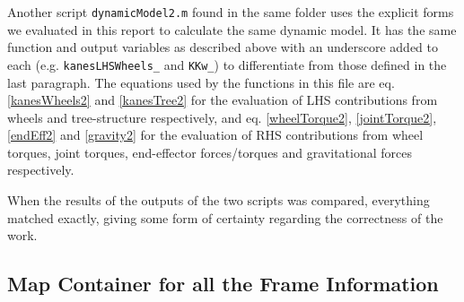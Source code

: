 \documentclass[a4paper,10pt]{article}
\begin{document}
Another script \texttt{dynamicModel2.m} found in the same folder uses the explicit forms we evaluated in this report to calculate the same dynamic model. It has the same function and output variables as described above with an underscore added to each (e.g. \texttt{kanesLHSWheels\_} and \texttt{KKw\_}) to differentiate from those defined in the last paragraph. The equations used by the functions in this file are eq. \ref{kanesWheels2} and \ref{kanesTree2} for the evaluation of LHS contributions from wheels and tree-structure respectively, and eq. \ref{wheelTorque2}, \ref{jointTorque2}, \ref{endEff2} and \ref{gravity2} for the evaluation of RHS contributions from wheel torques, joint torques, end-effector forces/torques and gravitational forces respectively.

When the results of the outputs of the two scripts was compared, everything matched exactly, giving some form of certainty regarding the correctness of the work.


\subsection{Map Container for all the Frame Information}
\end{document}
